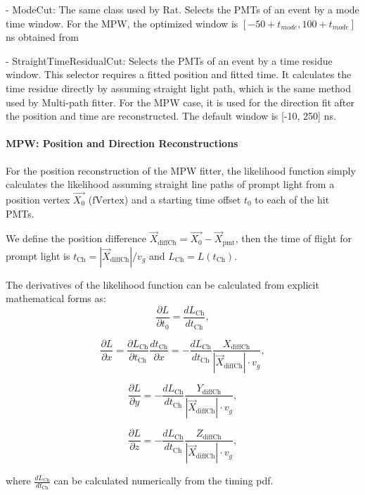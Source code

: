 \begin{itemize}
	- ModeCut: The same class used by Rat. Selects the PMTs of an event by a mode time window. For the MPW, the optimized window is $[-50 + t_{mode}, 100 + t_{mode}]$ ns obtained from %
	
	- StraightTimeResidualCut: Selects the PMTs of an event by a time residue window. This selector requires a fitted position and fitted time. It calculates the time residue directly by assuming straight light path, which is the same method used by Multi-path fitter. For the MPW case, it is used for the direction fit after the position and time are reconstructed. The default window is [-10, 250] ns.
	
\end{itemize}

\paragraph{MPW: Position and Direction Reconstructions}

For the position reconstruction of the MPW fitter, the likelihood function simply calculates the likelihood assuming straight line paths of prompt light from a position vertex $\vec{X_0}$ ($\mathrm{fVertex}$) and a starting time offset $t_0$ to each of the hit PMTs. 



We define the position difference $\vec{X}_{{\mathrm{diffCh}}} = \vec{X_0}-\vec{X}_{\mathrm{pmt}}$, then the time of flight for prompt light is  $t_{\mathrm{Ch}}=|\vec{X}_{{\mathrm{diffCh}}}|/v_g$ and $L_{\mathrm{Ch}}=L(t_{\mathrm{Ch}})$.

The derivatives of the likelihood function can be calculated from explicit mathematical forms as:
\[
\frac{\partial L}{\partial t_0}=\frac{dL_{\mathrm{Ch}}}{dt_{\mathrm{Ch}}},
\]

\[
\frac{\partial L}{\partial x}=\frac{\partial L_{\mathrm{Ch}}}{\partial t_{\mathrm{Ch}}}\frac{dt_{\mathrm{Ch}}}{\partial x}=-\frac{dL_{\mathrm{Ch}}}{dt_{\mathrm{Ch}}}\frac{X_{{\mathrm{diffCh}}}}{|\vec{X}_{{\mathrm{diffCh}}}|\cdot v_g},
\]

\[
\frac{\partial L}{\partial y}=-\frac{dL_{\mathrm{Ch}}}{dt_{\mathrm{Ch}}}\frac{Y_{{\mathrm{diffCh}}}}{|\vec{X}_{{\mathrm{diffCh}}}|\cdot v_g},
\]

\[
\frac{\partial L}{\partial z}=-\frac{dL_{\mathrm{Ch}}}{dt_{\mathrm{Ch}}}\frac{Z_{{\mathrm{diffCh}}}}{|\vec{X}_{{\mathrm{diffCh}}}|\cdot v_g},
\]

where $\frac{dL_{\mathrm{Ch}}}{dt_{\mathrm{Ch}}}$ can be calculated numerically from the timing pdf. 

